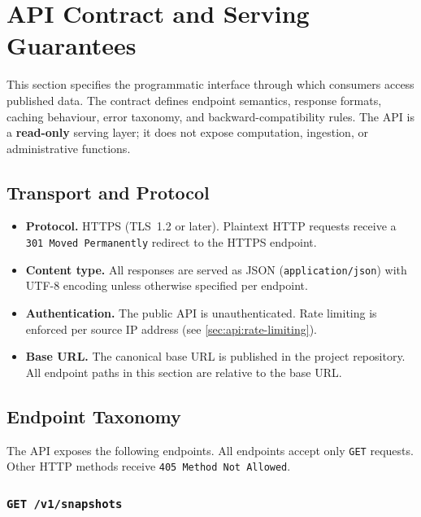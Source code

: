 \section{API Contract and Serving Guarantees}\label{sec:api-contract}

This section specifies the programmatic interface through which consumers
access published \ISI data.  The contract defines endpoint semantics,
response formats, caching behaviour, error taxonomy, and backward-compatibility
rules.  The API is a \textbf{read-only} serving layer; it does not expose
computation, ingestion, or administrative functions.

\subsection{Transport and Protocol}\label{sec:api:transport}

\begin{itemize}
  \item \textbf{Protocol.}  HTTPS (TLS~1.2 or later).  Plaintext HTTP
    requests receive a \texttt{301 Moved Permanently} redirect to the HTTPS
    endpoint.
  \item \textbf{Content type.}  All responses are served as
    JSON (\texttt{application/json}) with UTF-8 encoding unless
    otherwise specified per endpoint.
  \item \textbf{Authentication.}  The public API is unauthenticated.  Rate
    limiting is enforced per source IP address (see
    \cref{sec:api:rate-limiting}).
  \item \textbf{Base URL.}  The canonical base URL is published in the
    project repository.  All endpoint paths in this section are relative to
    the base URL.
\end{itemize}

\subsection{Endpoint Taxonomy}\label{sec:api:endpoints}

The API exposes the following endpoints.  All endpoints accept only
\texttt{GET} requests.  Other HTTP methods receive
\texttt{405 Method Not Allowed}.

\subsubsection{\texttt{GET /v1/snapshots}}

